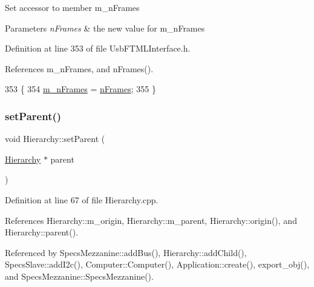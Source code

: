 Set accessor to member m\+\_\+n\+Frames 
\begin{DoxyParams}{Parameters}
{\em n\+Frames} & the new value for m\+\_\+n\+Frames \\
\hline
\end{DoxyParams}


Definition at line 353 of file Usb\+F\+T\+M\+L\+Interface.\+h.



References m\+\_\+n\+Frames, and n\+Frames().


\begin{DoxyCode}
353                                      \{
354     \hyperlink{classUsbFTMLInterface_ac7b9fb80fb8653a366c53ce3567cb823}{m\_nFrames} = \hyperlink{classUsbFTMLInterface_a55531536a54b736b9c9c38bb792ec4c9}{nFrames};
355   \}
\end{DoxyCode}
\mbox{\label{classHierarchy_a585ad1aeec16077a0e532ab8b4fc557b}} 
\subsubsection{\texorpdfstring{set\+Parent()}{setParent()}}
{\footnotesize\ttfamily void Hierarchy\+::set\+Parent (\begin{DoxyParamCaption}\item[{\hyperlink{classHierarchy}{Hierarchy} $\ast$}]{parent }\end{DoxyParamCaption})\hspace{0.3cm}{\ttfamily [inherited]}}



Definition at line 67 of file Hierarchy.\+cpp.



References Hierarchy\+::m\+\_\+origin, Hierarchy\+::m\+\_\+parent, Hierarchy\+::origin(), and Hierarchy\+::parent().



Referenced by Specs\+Mezzanine\+::add\+Bus(), Hierarchy\+::add\+Child(), Specs\+Slave\+::add\+I2c(), Computer\+::\+Computer(), Application\+::create(), export\+\_\+obj(), and Specs\+Mezzanine\+::\+Specs\+Mezzanine().


